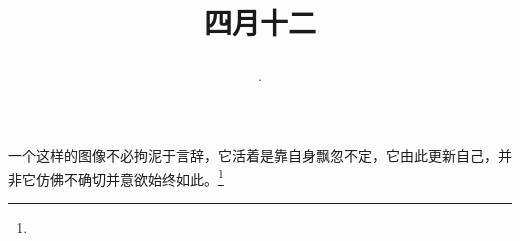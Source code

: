 \title{\date[d=19,m=5,y=2024][year:cn-y,年,month:cn,day:cn,日,·,weekday]·四月十二 }
一个这样的图像不必拘泥于言辞，它活着是靠自身飘忽不定，它由此更新自己，并非它仿佛不确切并意欲始终如此。\footnote{ }

